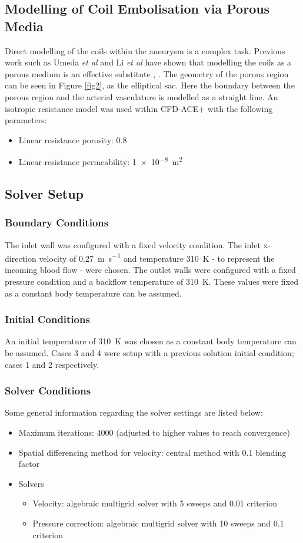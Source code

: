 \documentclass[journal,twoside,web]{ieeecolor}
\begin{document}
\subsection{Modelling of Coil Embolisation via Porous Media}
Direct modelling of the coils within the aneurysm is a complex task. Previous work such as Umeda \textit{et al} and Li \textit{et al} have shown that modelling the coils as a porous medium is an effective substitute \cite{10.1371/journal.pone.0190222}, \cite{1231512}. The geometry of the porous region can be seen in Figure \ref{fig2}, as the elliptical sac. Here the boundary between the porous region and the arterial vasculature is modelled as a straight line. An isotropic resistance model was used within CFD-ACE+ with the following parameters:
\begin{itemize}
    \item Linear resistance porosity: 0.8
    \item Linear resistance permeability: \SI{1e-8}{m^2}
\end{itemize}

\subsection{Solver Setup}\label{solverSetup}
\subsubsection{Boundary Conditions}
The inlet wall was configured with a fixed velocity condition. The inlet x-direction velocity of \SI{0.27}{\meter\per\second} and temperature \SI{310}{\kelvin} - to represent the incoming blood flow - were chosen. The outlet walls were configured with a fixed pressure condition and a backflow temperature of \SI{310}{\kelvin}. These values were fixed as a constant body temperature can be assumed.
\subsubsection{Initial Conditions}
An initial temperature of \SI{310}{\kelvin} was chosen as a constant body temperature can be assumed. Cases 3 and 4 were setup with a previous solution initial condition; cases 1 and 2 respectively.
\subsubsection{Solver Conditions}
Some general information regarding the solver settings are listed below:
\begin{itemize}
    \item Maximum iterations: 4000 (adjusted to higher values to reach convergence)
    \item Spatial differencing method for velocity: central method with 0.1 blending factor
    \item Solvers
          \begin{itemize}
              \item Velocity: algebraic multigrid solver with 5 sweeps and 0.01 criterion
              \item Pressure correction: algebraic multigrid solver with 10 sweeps and 0.1 criterion
          \end{itemize}
\end{itemize}
\end{document}
